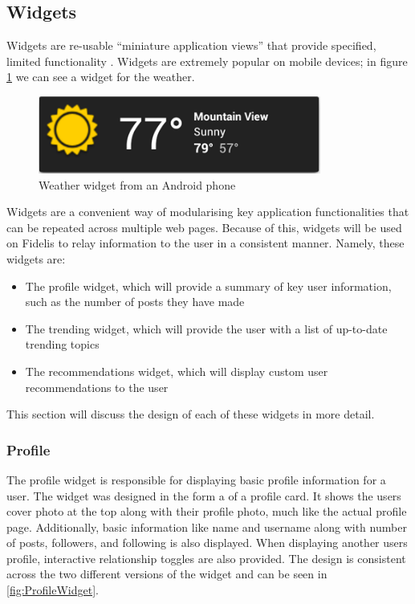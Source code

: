 \subsection{Widgets}
Widgets are re-usable ``miniature application views'' that provide specified, limited functionality \cite{AndroidDevelopers:Widgets}. Widgets are extremely popular on mobile devices; in figure \ref{fig:WeatherWidget} we can see a widget for the weather. 

\begin{figure}[H]
\centering
\includegraphics[height=1in]{Images/Design/AppWidget}
\caption{Weather widget from an Android phone}
\label{fig:WeatherWidget}
\end{figure}

Widgets are a convenient way of modularising key application functionalities that can be repeated across multiple web pages. Because of this, widgets will be used on Fidelis to relay information to the user in a consistent manner. Namely, these widgets are:

\begin{itemize}
\item The profile widget, which will provide a summary of key user information, such as the number of posts they have made
\item The trending widget, which will provide the user with a list of up-to-date trending topics
\item The recommendations widget, which will display custom user recommendations to the user
\end{itemize}

This section will discuss the design of each of these widgets in more detail.

\subsubsection{Profile}
The profile widget is responsible for displaying basic profile information for a user. The widget was designed in the form a of a profile card. It shows the users cover photo at the top along with their profile photo, much like the actual profile page. Additionally, basic information like name and username along with number of posts, followers, and following is also displayed. When displaying another users profile, interactive relationship toggles are also provided. The design is consistent across the two different versions of the widget and can be seen in \ref{fig:ProfileWidget}.

